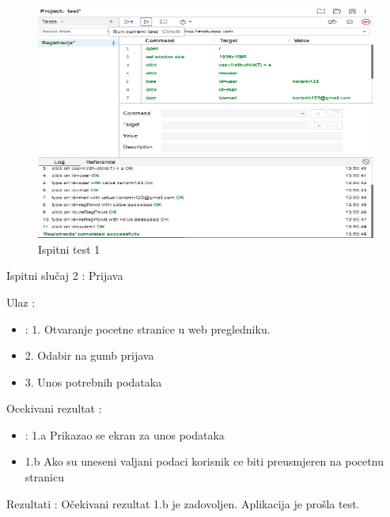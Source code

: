 			\begin{figure}[H]
				\includegraphics[width=1\linewidth]{slike/ispitni_test_1.png} %
				\caption{Ispitni test 1}
				\label{fig:Test1} %
			\end{figure}
			
			\noindent Ispitni slučaj 2 : Prijava

			\noindent Ulaz : 
	
			\begin{itemize}
				\item : 1. Otvaranje pocetne stranice u web pregledniku.
				\item   2. Odabir na gumb prijava
				\item   3. Unos potrebnih podataka
			\end{itemize}

			\noindent Ocekivani rezultat : 

			\begin{itemize}
				\item : 1.a Prikazao se ekran za unos podataka
				\item   1.b Ako su uneseni valjani podaci korisnik ce biti preusmjeren na pocetnu stranicu
			\end{itemize}
	
			\noindent Rezultati : Očekivani rezultat 1.b je zadovoljen. Aplikacija je prošla test. 

